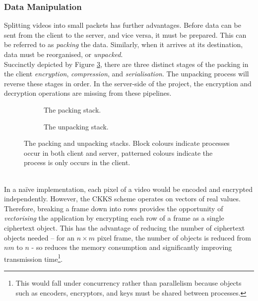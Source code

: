 \setlength{\leftskip}{0cm}
\subsubsection{Data Manipulation}
\setlength{\leftskip}{0.5cm}
\indent \indent
Splitting videos into small packets has further advantages. Before data can be sent from the client to the server, and vice versa, it must be prepared. This can be referred to as \textit{packing} the data. Similarly, when it arrives at its destination, data must be reorganised, or \textit{unpacked}.
\smallskip \\ \indent
Succinctly depicted by Figure \ref{fig:packingAndUnpacking}, there are three distinct stages of the packing in the client \textit{encryption}, \textit{compression}, and \textit{serialisation}. The unpacking process will reverse these stages in order. In the server-side of the project, the encryption and decryption operations are missing from these pipelines.
\begin{figure}[htp]
    \begin{subfigure}[b]{0.5\textwidth}
        \centering
        \scalebox{0.8}{}
        \caption{The packing stack.}
        \label{fig:packing}
    \end{subfigure}%
    \begin{subfigure}[b]{0.5\textwidth}
        \centering
        \scalebox{0.8}{}
        \caption{The unpacking stack.}
        \label{fig:unpacking}
    \end{subfigure}%
    \caption[Packing and Unpacking]{The packing and unpacking stacks. Block colours indicate processes occur in both client and server, patterned colours indicate the process is only occurs in the client.}
    \label{fig:packingAndUnpacking}
\end{figure}
\smallskip \\ \indent
In a na\"ive implementation, each pixel of a video would be encoded and encrypted independently. However, the CKKS scheme operates on vectors of real values. Therefore, breaking a frame down into rows provides the opportunity of \textit{vectorising} the application by encrypting each row of a frame as a single ciphertext object. This has the advantage of reducing the number of ciphertext objects needed – for an $n \times m$ pixel frame, the number of objects is reduced from $nm$ to $n$ - so reduces the memory consumption and significantly improving transmission time\footnote{This would fall under concurrency rather than parallelism because objects such as encoders, encryptors, and keys must be shared between processes.}.
